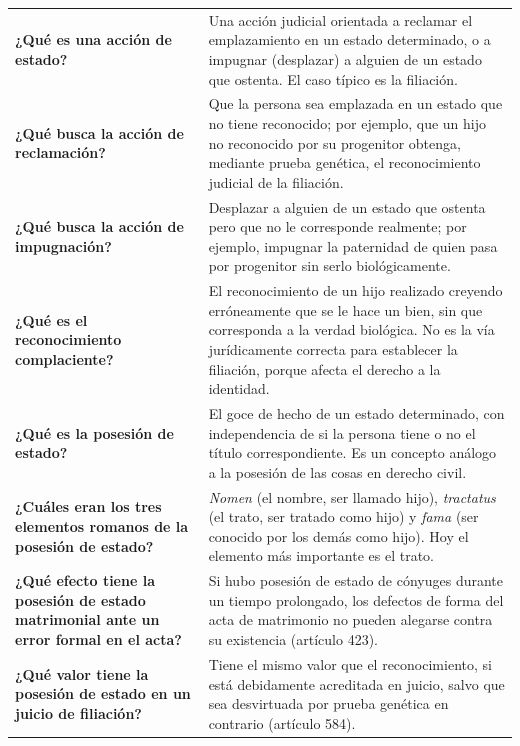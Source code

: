 \documentclass[12pt,oneside]{book}
\begin{document}
\begin{longtable}{
    >{\raggedright\arraybackslash}p{}
    >{\raggedright\arraybackslash}p{}
}
\textbf{¿Qué es una acción de estado?} &
Una acción judicial orientada a reclamar el emplazamiento en un estado determinado, o a impugnar (desplazar) a alguien de un estado que ostenta. El caso típico es la filiación. \\

\textbf{¿Qué busca la acción de reclamación?} &
Que la persona sea emplazada en un estado que no tiene reconocido; por ejemplo, que un hijo no reconocido por su progenitor obtenga, mediante prueba genética, el reconocimiento judicial de la filiación. \\

\textbf{¿Qué busca la acción de impugnación?} &
Desplazar a alguien de un estado que ostenta pero que no le corresponde realmente; por ejemplo, impugnar la paternidad de quien pasa por progenitor sin serlo biológicamente. \\

\textbf{¿Qué es el reconocimiento complaciente?} &
El reconocimiento de un hijo realizado creyendo erróneamente que se le hace un bien, sin que corresponda a la verdad biológica. No es la vía jurídicamente correcta para establecer la filiación, porque afecta el derecho a la identidad. \\

\textbf{¿Qué es la posesión de estado?} &
El goce de hecho de un estado determinado, con independencia de si la persona tiene o no el título correspondiente. Es un concepto análogo a la posesión de las cosas en derecho civil. \\

\textbf{¿Cuáles eran los tres elementos romanos de la posesión de estado?} &
\textit{Nomen} (el nombre, ser llamado hijo), \textit{tractatus} (el trato, ser tratado como hijo) y \textit{fama} (ser conocido por los demás como hijo). Hoy el elemento más importante es el trato. \\

\textbf{¿Qué efecto tiene la posesión de estado matrimonial ante un error formal en el acta?} &
Si hubo posesión de estado de cónyuges durante un tiempo prolongado, los defectos de forma del acta de matrimonio no pueden alegarse contra su existencia (artículo 423). \\

\textbf{¿Qué valor tiene la posesión de estado en un juicio de filiación?} &
Tiene el mismo valor que el reconocimiento, si está debidamente acreditada en juicio, salvo que sea desvirtuada por prueba genética en contrario (artículo 584). \\


\end{longtable}
\end{document}
